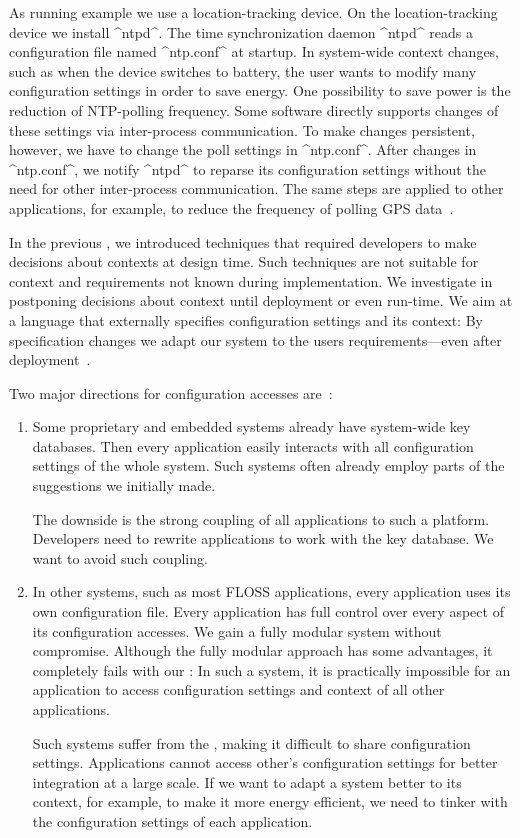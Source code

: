 As running example we use a location-tracking device.
On the location-tracking device we install ^ntpd^.
The time synchronization daemon ^ntpd^ reads a configuration file named ^ntp.conf^ at startup.
In system-wide context changes, such as when the device switches to battery, the user wants to modify many configuration settings in order to save energy.
One possibility to save power is the reduction of NTP-polling frequency.
Some software directly supports changes of these settings via inter-process communication.
To make changes persistent, however, we have to change the poll settings in ^ntp.conf^.
After changes in ^ntp.conf^, we notify ^ntpd^ to reparse its configuration settings without the need for other inter-process communication.
The same steps are applied to other applications, for example, to reduce the frequency of polling GPS data~\cite{raab2016improving}.


In the previous , we introduced techniques that required developers to make decisions about contexts at design time.
Such techniques are not suitable for context and requirements not known during implementation.
We investigate in postponing decisions about context until deployment or even run-time.
We aim at a language that externally specifies configuration settings and its context:
By specification changes we adapt our system to the users requirements---even after deployment~\cite{raab2016improving}.



Two major directions for configuration accesses are~\cite{raab2016improving}:

\begin{enumerate}
\item
Some proprietary and embedded systems already have system-wide key databases.
Then every application easily interacts with all configuration settings of the whole system.
Such systems often already employ parts of the suggestions we initially made.

The downside is the strong coupling of all applications to such a platform.
Developers need to rewrite applications to work with the key database.
We want to avoid such coupling.

\item
In other systems, such as most FLOSS applications, every application uses its own configuration file.
Every application has full control over every aspect of its configuration accesses.
We gain a fully modular system without compromise.
Although the fully modular approach has some advantages, it completely fails with our :
In such a system, it is practically impossible for an application to access configuration settings and context of all other applications.

Such systems suffer from the , making it difficult to share configuration settings.
Applications cannot access other's configuration settings for better integration at a large scale.
If we want to adapt a system better to its context, for example, to make it more energy efficient, we need to tinker with the configuration settings of each application.
\end{enumerate}


